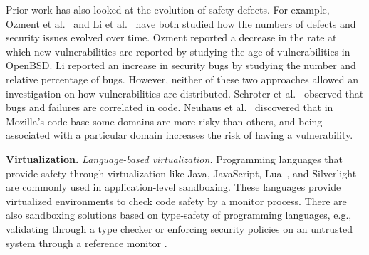
Prior work has also looked at the evolution of safety defects. For example, 
Ozment et al.~\cite{ozment2006milk} and Li et al.~\cite{li2006have} have 
both studied how the numbers of defects and security issues evolved over 
time. Ozment reported a decrease in the rate at which new vulnerabilities 
are reported by studying the age of vulnerabilities in OpenBSD. Li 
reported an increase in security bugs by studying the number and relative 
percentage of bugs. However, neither of these two approaches allowed 
an investigation on how vulnerabilities are distributed. 
Schroter et al.~\cite{schroter2006predicting} observed that bugs and
failures are correlated in code. Neuhaus et al.~\cite{neuhaus2007predicting} 
discovered that in Mozilla's code base
some domains are more risky than others, and being associated with a 
particular domain increases the risk of having a vulnerability. 

\textbf{Virtualization.}
\textit{Language-based virtualization.}
Programming languages that provide safety through virtualization like
Java, JavaScript, Lua~\cite{Lua}, and
Silverlight~\cite{Silverlight} are commonly used in application-level
sandboxing. These languages provide virtualized environments to
check code safety by a monitor process. 
%
There are also sandboxing solutions based on type-safety of programming
languages, e.g., validating through a type checker \cite{JS-Sandboxing}
or enforcing security policies on an untrusted system through a
reference monitor \cite{JS-Sandboxing1}. %

